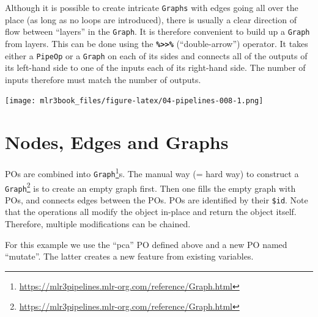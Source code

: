 \documentclass[12pt,]{scrbook}
\newenvironment{Shaded}{}{}
\newcommand{\CommentTok}[1]{\textcolor[rgb]{0.00,0.50,0.00}{#1}}
\newcommand{\DataTypeTok}[1]{#1}
\newcommand{\KeywordTok}[1]{\textcolor[rgb]{0.00,0.00,1.00}{#1}}
\newcommand{\NormalTok}[1]{#1}
\newcommand{\OperatorTok}[1]{#1}
\newcommand{\OtherTok}[1]{\textcolor[rgb]{1.00,0.25,0.00}{#1}}
\newcommand{\StringTok}[1]{\textcolor[rgb]{0.00,0.50,0.50}{#1}}
\renewcommand{\href}[2]{#2\footnote{\url{#1}}}
\begin{document}
Although it is possible to create intricate \texttt{Graphs} with edges going all over the place (as long as no loops are introduced), there is usually a clear direction of flow between ``layers'' in the \texttt{Graph}.
It is therefore convenient to build up a \texttt{Graph} from layers.
This can be done using the \textbf{\texttt{\%\textgreater{}\textgreater{}\%}} (``double-arrow'') operator.
It takes either a \texttt{PipeOp} or a \texttt{Graph} on each of its sides and connects all of the outputs of its left-hand side to one of the inputs each of its right-hand side.
The number of inputs therefore must match the number of outputs.

\begin{Shaded}
\end{Shaded}

\texttt{[image: mlr3book\_files/figure-latex/04-pipelines-008-1.png]}

\hypertarget{pipe-nodes-edges-graphs}{%
\section{Nodes, Edges and Graphs}\label{pipe-nodes-edges-graphs}}

POs are combined into \href{https://mlr3pipelines.mlr-org.com/reference/Graph.html}{\texttt{Graph}}s.
The manual way (= hard way) to construct a \href{https://mlr3pipelines.mlr-org.com/reference/Graph.html}{\texttt{Graph}} is to create an empty graph first.
Then one fills the empty graph with POs, and connects edges between the POs.
POs are identified by their \texttt{\$id}.
Note that the operations all modify the object in-place and return the object itself.
Therefore, multiple modifications can be chained.

For this example we use the ``pca'' PO defined above and a new PO named ``mutate''.
The latter creates a new feature from existing variables.
\end{document}
